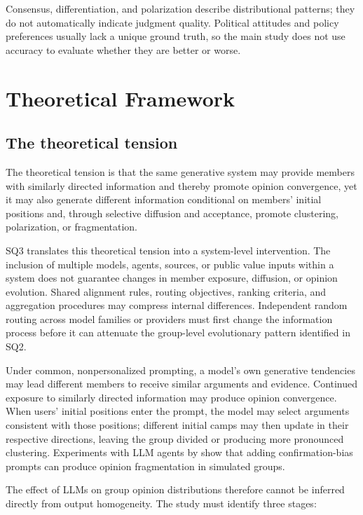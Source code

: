 \documentclass[11pt,a4paper]{article}
\begin{document}
Consensus, differentiation, and polarization describe distributional patterns; they do not automatically indicate judgment quality. Political attitudes and policy preferences usually lack a unique ground truth, so the main study does not use accuracy to evaluate whether they are better or worse.

\section{Theoretical Framework}

\subsection{The theoretical tension}

The theoretical tension is that the same generative system may provide members with similarly directed information and thereby promote opinion convergence, yet it may also generate different information conditional on members' initial positions and, through selective diffusion and acceptance, promote clustering, polarization, or fragmentation.

SQ3 translates this theoretical tension into a system-level intervention. The inclusion of multiple models, agents, sources, or public value inputs within a system does not guarantee changes in member exposure, diffusion, or opinion evolution. Shared alignment rules, routing objectives, ranking criteria, and aggregation procedures may compress internal differences. Independent random routing across model families or providers must first change the information process before it can attenuate the group-level evolutionary pattern identified in SQ2.

Under common, nonpersonalized prompting, a model's own generative tendencies may lead different members to receive similar arguments and evidence. Continued exposure to similarly directed information may produce opinion convergence. When users' initial positions enter the prompt, the model may select arguments consistent with those positions; different initial camps may then update in their respective directions, leaving the group divided or producing more pronounced clustering. Experiments with LLM agents by \citet{chuang2024} show that adding confirmation-bias prompts can produce opinion fragmentation in simulated groups.

The effect of LLMs on group opinion distributions therefore cannot be inferred directly from output homogeneity. The study must identify three stages:
\end{document}
